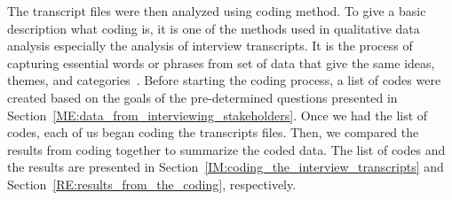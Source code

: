 The transcript files were then analyzed using coding method. To give a basic description what coding is, it is one of the methods used in qualitative data analysis especially the analysis of interview transcripts. It is the process of capturing essential words or phrases from set of data that give the same ideas, themes, and categories~\cite{OnlineQDA}. Before starting the coding process, a list of codes were created based on the goals of the pre-determined questions presented in Section~\ref{ME:data_from_interviewing_stakeholders}. Once we had the list of codes, each of us began coding the transcripts files. Then, we compared the results from coding together to summarize the coded data. The list of codes and the results are presented in Section~\ref{IM:coding_the_interview_transcripts} and Section~\ref{RE:results_from_the_coding}, respectively.


